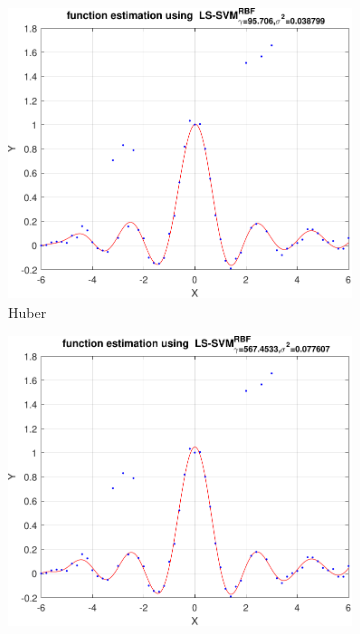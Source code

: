 \documentclass{article}
\begin{document}
        \begin{figure}[h]
             \centering
             \begin{subfigure}[b]{0.22\textwidth}
                 \centering
                 \includegraphics[width=\textwidth]{Assignment 2/figures/1_4/robust_mae_whuber.pdf}
                 \caption{Huber}
                 \label{fig:robust_regression_huber}
             \end{subfigure}
             \hfill
            \begin{subfigure}[b]{0.22\textwidth}
                 \centering
                 \includegraphics[width=\textwidth]{Assignment 2/figures/1_4/robust_mae_whampel.pdf}

\end{subfigure}
\end{figure}
\end{document}
